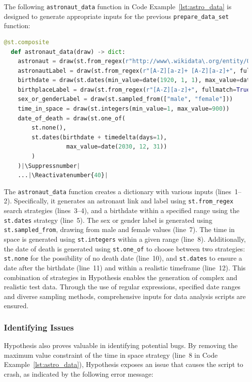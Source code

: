 \documentclass[runningheads]{llncs}
\makeatletter
\let\origthelstnumber\thelstnumber
\newcommand*\Suppressnumber{%
  \lst@AddToHook{OnNewLine}{%
    \let\thelstnumber\relax%
     \advance\c@lstnumber-\@ne\relax%
    }%
}
\newcommand*\Reactivatenumber[1]{%
  \setcounter{lstnumber}{\numexpr#1-1\relax}
  \lst@AddToHook{OnNewLine}{%
   \let\thelstnumber\origthelstnumber%
   \refstepcounter{lstnumber}%
  }%
}
\makeatother
\begin{document}
The following \texttt{astronaut\_data} function in Code Example~\ref{lst:astro_data} is designed to generate appropriate inputs for the previous \texttt{prepare\_data\_set} function:

\begin{lstlisting}[language=Python,caption={Astronaut Data from \texttt{data\_analysis.ipynb}},label=lst:astro_data]
  @st.composite
  def astronaut_data(draw) -> dict:
    astronaut = draw(st.from_regex(r"http://www\.wikidata\.org/entity/Q\d+", fullmatch=True))
    astronautLabel = draw(st.from_regex(r"[A-Z][a-z]+ [A-Z][a-z]+", fullmatch=True))
    birthdate = draw(st.dates(min_value=date(1920, 1, 1), max_value=date(2030, 12, 31)))
    birthplaceLabel = draw(st.from_regex(r"[A-Z][a-z]+", fullmatch=True))
    sex_or_genderLabel = draw(st.sampled_from(["male", "female"]))
    time_in_space = draw(st.integers(min_value=1, max_value=900)) 
    date_of_death = draw(st.one_of(
        st.none(), 
        st.dates(birthdate + timedelta(days=1), 
                  max_value=date(2030, 12, 31))
        )
    )|\Suppressnumber|
    ...|\Reactivatenumber{40}|

\end{lstlisting}
The \texttt{astronaut\_data} function creates a dictionary with various inputs (lines~1--2). Specifically, it generates an astronaut link and label using \texttt{st.from\_regex} search strategies (lines~3--4), and a birthdate within a specified range using the \texttt{st.dates} strategy (line~5). The sex or gender label is generated using \texttt{st.sampled\_from}, drawing from male and female values (line~7). The time in space is generated using \texttt{st.integers} within a given range (line~8). Additionally, the date of death is generated using \texttt{st.one\_of} to choose between two strategies: \texttt{st.none} for the possibility of no death date (line~10), and \texttt{st.dates} to ensure a date after the birthdate (line~11) and within a realistic timeframe (line~12). This combination of strategies in Hypothesis enables the generation of complex and realistic test data. Through the use of regular expressions, specified date ranges and diverse sampling methods, comprehensive inputs for data analysis scripts are ensured.

\subsubsection{Identifying Issues}
Hypothesis also proves valuable in identifying potential bugs. By removing the maximum value constraint of the time in space strategy (line~8 in Code Example~\ref{lst:astro_data}), Hypothesis exposes an issue that causes the script to crash, as indicated by the following error message:
\end{document}
